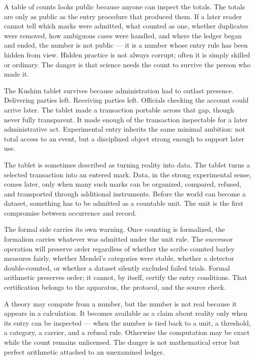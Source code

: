 A table of counts looks public because anyone can inspect the totals. The
totals are only as public as the entry procedure that produced them. If a
later reader cannot tell which marks were admitted, what counted as one,
whether duplicates were removed, how ambiguous cases were handled, and
where the ledger began and ended, the number is not public --- it is a
number whose entry rule has been hidden from view. Hidden practice is not
always corrupt; often it is simply skilled or ordinary. The danger
is that science needs the count to survive the person who made it.

The Kushim tablet survives because administration had to outlast presence.
Delivering parties left. Receiving parties left. Officials checking the
account could arrive later. The tablet made a transaction portable across
that gap, though never fully transparent. It made enough of the transaction
inspectable for a later administrative act. Experimental entry inherits the
same minimal ambition: not total access to an event, but a disciplined
object strong enough to support later use.

The tablet is sometimes described as turning reality into data. The tablet
turns a selected transaction into an entered mark. Data, in the strong
experimental sense, comes later, only when many such marks can be organized,
compared, refused, and transported through additional instruments. Before
the world can become a dataset, something has to be admitted as a countable
unit. The unit is the first compromise between occurrence and record.

The formal side carries its own warning. Once counting is formalized, the
formalism carries whatever was admitted under the unit rule. The successor
operation will preserve order regardless of
whether the scribe counted barley measures fairly, whether Mendel's
categories were stable, whether a detector double-counted, or whether a
dataset silently excluded failed trials. Formal arithmetic preserves order;
it cannot, by itself, certify the entry conditions. That certification
belongs to the apparatus, the protocol, and the source check.

A theory may compute from a number, but the number is not real because it
appears in a calculation. It becomes available as a claim
about reality only when its entry can be inspected --- when the number is tied
back to a unit, a threshold, a category, a carrier, and a refusal rule.
Otherwise the computation may be exact while the count remains unlicensed.
The danger is not mathematical error but perfect arithmetic attached to an
unexamined ledger.

